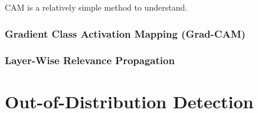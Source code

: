 \documentclass[conference]{IEEEtran}
\begin{document}
CAM is a relatively simple method to understand.

\subsubsection{Gradient Class Activation Mapping (Grad-CAM)}

\subsubsection{Layer-Wise Relevance Propagation}

\subsubsection{}

\section{Out-of-Distribution Detection}



\end{document}
